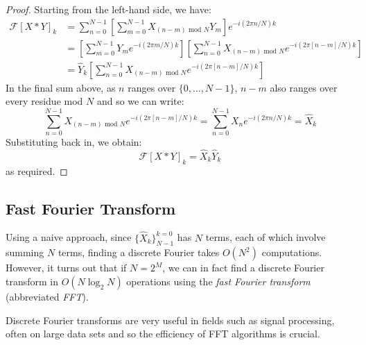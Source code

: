 \documentclass[../main.tex]{subfiles}
\begin{document}
\begin{proof}
  Starting from the left-hand side, we have:
  \begin{align*}
    \mathcal{F}[X \ast Y]_k &= \sum_{n = 0}^{N - 1} \left[\sum_{m = 0}^{N - 1} X_{(n - m) \text{ mod } N} Y_m \right]e^{-i(2 \pi n/N)k} \\
                            &= \left[\sum_{m = 0}^{N - 1} Y_m e^{-i(2 \pi m/N) k}\right]\left[\sum_{n = 0}^{N - 1} X_{(n - m) \text{ mod } N}e^{-i(2\pi[n - m]/N)k}\right] \\
                            &= \hat{Y}_k \left[\sum_{n = 0}^{N - 1} X_{(n - m) \text{ mod } N}e^{-i(2\pi[n - m]/N)k}\right]
  \end{align*}
  In the final sum above, as $n$ ranges over $\{0, \ldots, N - 1\}$, $n - m$ also ranges over every residue mod $N$ and so we can write:
  \[
    \sum_{n = 0}^{N - 1} X_{(n - m) \text{ mod } N}e^{-i(2\pi[n - m]/N)k} = \sum_{n = 0}^{N - 1} X_n e^{-i(2\pi n/N)k} = \hat{X}_k
  \]
  Substituting back in, we obtain:
  \[
    \mathcal{F}[X \ast Y]_k = \hat{X}_k \hat{Y}_k
  \]
  as required.
\end{proof}
\subsection{Fast Fourier Transform}
\nonexaminable
Using a naive approach, since $\{\hat{X}_k\}^{k = 0}_{N - 1}$ has $N$ terms, each of which involve summing $N$ terms, finding a discrete Fourier takes $O(N^2)$ computations.
However, it turns out that if $N = 2^{M}$, we can in fact find a discrete Fourier transform in $O(N \log_2 N)$ operations using the \textit{fast Fourier transform} (abbreviated \textit{FFT}).

Discrete Fourier transforms are very useful in fields such as signal processing, often on large data sets and so the efficiency of FFT algorithms is crucial.
\end{document}

